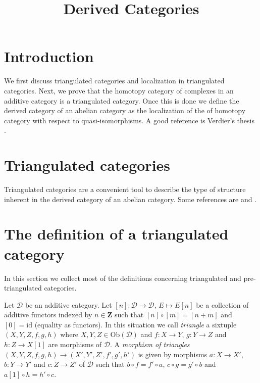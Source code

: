 

%


\title{Derived Categories}


\maketitle

\label{section-phantom}

\tableofcontents

\section{Introduction}
\label{section-introduction}

\noindent
We first discuss triangulated categories and localization in triangulated
categories. Next, we prove that the homotopy category of complexes in an
additive category is a triangulated category. Once this is done we define
the derived category of an abelian category as the localization of the
of homotopy category with respect to quasi-isomorphisms.
A good reference is Verdier's thesis \cite{Verdier}.



\section{Triangulated categories}
\label{section-triangulated-categories}

\noindent
Triangulated categories are a convenient tool to describe the type
of structure inherent in the derived category of an abelian category.
Some references are \cite{Verdier} and \cite{Neeman}.




\section{The definition of a triangulated category}
\label{section-triangulated-definitions}

\noindent
In this section we collect most of the definitions concerning triangulated
and pre-triangulated categories.

\begin{definition}
\label{definition-triangle}
Let $\mathcal{D}$ be an additive category.
Let $[n] : \mathcal{D} \to \mathcal{D}$, $E \mapsto E[n]$
be a collection of additive functors indexed by $n \in \mathbf{Z}$ such that
$[n] \circ [m] = [n + m]$  and $[0] = \text{id}$ (equality as functors).
In this situation
we call {\it triangle} a sixtuple $(X, Y, Z, f, g, h)$
where $X, Y, Z \in \text{Ob}(\mathcal{D})$ and
$f : X \to Y$, $g : Y \to Z$ and $h : Z \to X[1]$ are morphisms
of $\mathcal{D}$.
A {\it morphism of triangles}
$(X, Y, Z, f, g, h) \to (X', Y', Z', f', g', h')$
is given by morphisms $a : X \to X'$, $b : Y \to Y'$ and $c : Z \to Z'$
of $\mathcal{D}$ such that
$b \circ f = f' \circ a$, $c  \circ g = g' \circ b$ and
$a[1] \circ h = h' \circ c$.
\end{definition}


